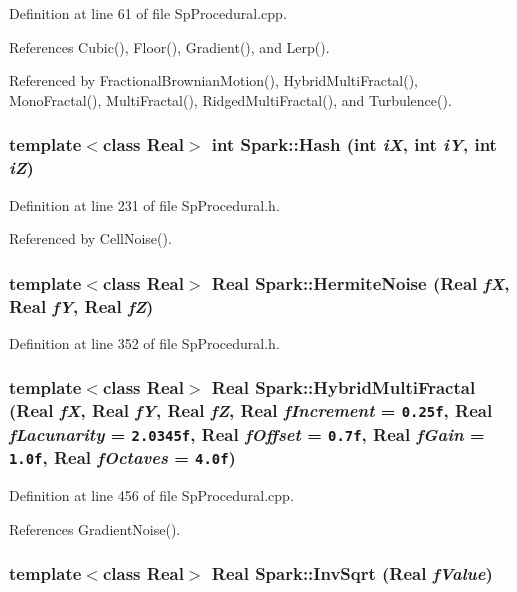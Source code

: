 Definition at line 61 of file Sp\-Procedural.cpp.

References Cubic(), Floor(), Gradient(), and Lerp().

Referenced by Fractional\-Brownian\-Motion(), Hybrid\-Multi\-Fractal(), Mono\-Fractal(), Multi\-Fractal(), Ridged\-Multi\-Fractal(), and Turbulence().
\subsubsection{\setlength{\rightskip}{0pt plus 5cm}template$<$class Real$>$ int Spark::Hash (int {\em i\-X}, int {\em i\-Y}, int {\em i\-Z})}\label{namespaceSpark_a93}


Definition at line 231 of file Sp\-Procedural.h.

Referenced by Cell\-Noise().
\subsubsection{\setlength{\rightskip}{0pt plus 5cm}template$<$class Real$>$ Real Spark::Hermite\-Noise (Real {\em f\-X}, Real {\em f\-Y}, Real {\em f\-Z})}\label{namespaceSpark_a108}


Definition at line 352 of file Sp\-Procedural.h.
\subsubsection{\setlength{\rightskip}{0pt plus 5cm}template$<$class Real$>$ Real Spark::Hybrid\-Multi\-Fractal (Real {\em f\-X}, Real {\em f\-Y}, Real {\em f\-Z}, Real {\em f\-Increment} = {\tt 0.25f}, Real {\em f\-Lacunarity} = {\tt 2.0345f}, Real {\em f\-Offset} = {\tt 0.7f}, Real {\em f\-Gain} = {\tt 1.0f}, Real {\em f\-Octaves} = {\tt 4.0f})}\label{namespaceSpark_a80}


Definition at line 456 of file Sp\-Procedural.cpp.

References Gradient\-Noise().
\subsubsection{\setlength{\rightskip}{0pt plus 5cm}template$<$class Real$>$ Real Spark::Inv\-Sqrt (Real {\em f\-Value})}\label{namespaceSpark_a45}


